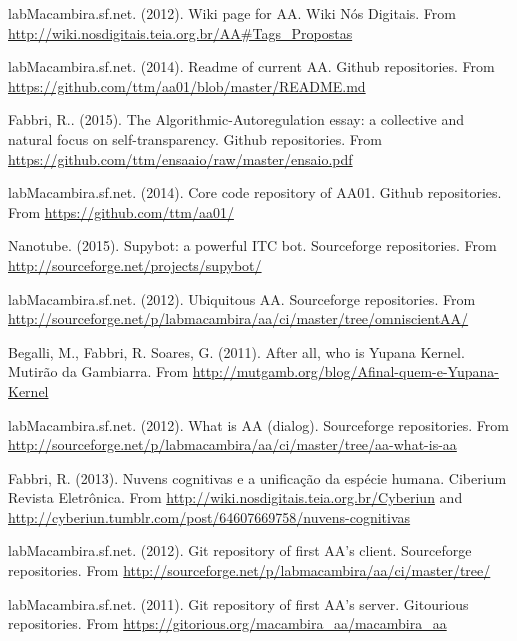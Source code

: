 \documentclass[12pt,fleqn]{article}
\begin{document}
\begin{thebibliography}{99}
	labMacambira.sf.net. (2012). Wiki page for AA.
		Wiki Nós Digitais. From \url{http://wiki.nosdigitais.teia.org.br/AA#Tags_Propostas}

	labMacambira.sf.net. (2014). Readme of current AA.
		Github repositories. From \url{https://github.com/ttm/aa01/blob/master/README.md}

	Fabbri, R.. (2015). The Algorithmic-Autoregulation essay: a collective and natural focus
		on self-transparency. Github repositories. From \url{https://github.com/ttm/ensaaio/raw/master/ensaio.pdf}

	labMacambira.sf.net. (2014). Core code repository of AA01.
		Github repositories. From \url{https://github.com/ttm/aa01/}

	Nanotube. (2015). Supybot: a powerful ITC bot.
		Sourceforge repositories. From \url{http://sourceforge.net/projects/supybot/}

	labMacambira.sf.net. (2012). Ubiquitous AA.
		Sourceforge repositories. From \url{http://sourceforge.net/p/labmacambira/aa/ci/master/tree/omniscientAA/}

	Begalli, M., Fabbri, R. Soares, G. (2011). After all, who is Yupana Kernel.
		Mutirão da Gambiarra. From \url{http://mutgamb.org/blog/Afinal-quem-e-Yupana-Kernel}

	labMacambira.sf.net. (2012). What is AA (dialog).
		Sourceforge repositories. From \url{http://sourceforge.net/p/labmacambira/aa/ci/master/tree/aa-what-is-aa}

	Fabbri, R. (2013). Nuvens cognitivas e a unificação da espécie humana.
	Ciberium Revista Eletrônica.
	From \url{http://wiki.nosdigitais.teia.org.br/Cyberiun}
	and \url{http://cyberiun.tumblr.com/post/64607669758/nuvens-cognitivas}

	labMacambira.sf.net. (2012). Git repository of first AA's client.
		Sourceforge repositories. From \url{http://sourceforge.net/p/labmacambira/aa/ci/master/tree/}

	labMacambira.sf.net. (2011). Git repository of first AA's server.
		Gitourious repositories. From \url{https://gitorious.org/macambira_aa/macambira_aa}


\end{thebibliography}
\end{document}
